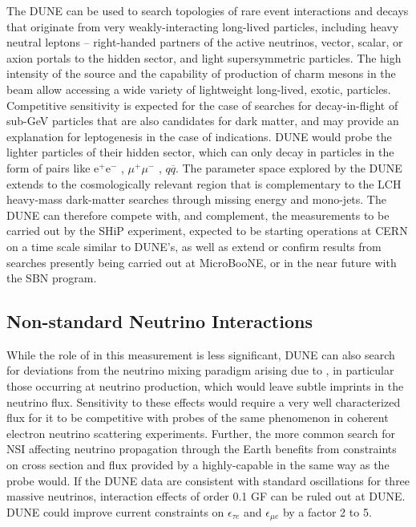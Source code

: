 The DUNE  can be used to search topologies of rare event interactions and decays that originate from very weakly-interacting long-lived particles, including heavy neutral leptons -- right-handed partners of the active neutrinos, vector, scalar, or axion portals to the hidden sector, and light supersymmetric particles. The high intensity of the  source and the capability of  production of charm mesons in the beam allow accessing a wide variety of lightweight long-lived, exotic, particles. Competitive sensitivity is expected for the case of searches for decay-in-flight of sub-GeV particles that are also candidates for dark matter, and may provide an explanation for leptogenesis in the case of  indications. DUNE would probe the lighter particles of their hidden sector, which can only decay in  particles in the form of pairs like e$^{+}$e$^{-}$  , $\mu^{+}\mu^{-}$ , $q\overline{q}$. The parameter space explored by the DUNE  extends to the cosmologically relevant region that is complementary to the LCH heavy-mass dark-matter searches through missing energy and mono-jets. The DUNE  can therefore compete with, and complement, the measurements to be carried out by the SHiP experiment, expected to be starting operations at CERN on a time scale similar to DUNE's, as well as extend or confirm results from searches presently being carried out at MicroBooNE, or in the near future with the SBN program.

\subsection{Non-standard Neutrino Interactions}
\label{ssec:exsum-nd-BSMappendix-NSI}

While the role of  in this measurement is less significant, DUNE can also search for deviations from the  neutrino mixing paradigm arising due to , in particular those occurring at neutrino production, which would leave subtle imprints in the neutrino flux. Sensitivity to these effects would require a very well characterized flux for it to be competitive with probes of the same phenomenon in coherent electron neutrino scattering experiments. Further, the more common search for NSI affecting neutrino propagation through the Earth benefits from constraints on cross section and flux provided by a highly-capable  in the same way as the  probe would. If the DUNE data are consistent with standard oscillations for three massive neutrinos, interaction effects of order 0.1 GF   can be ruled out at DUNE. DUNE could improve current constraints on $\epsilon_{\tau e}$ and $\epsilon_{\mu e}$ by a factor 2 to 5.



